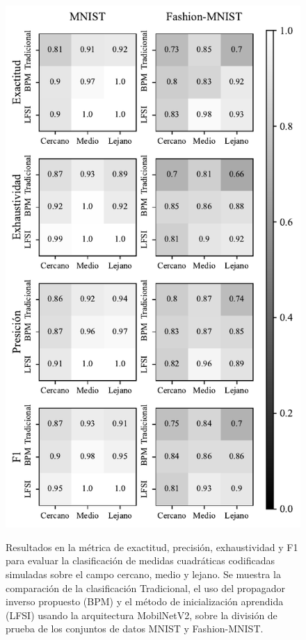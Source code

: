 \begin{figure}[!h]
    \centering
    \caption{Resultados en la métrica de exactitud, precisión, exhaustividad y F1 para evaluar la clasificación de medidas cuadráticas codificadas simuladas sobre el campo cercano, medio y lejano. Se muestra la comparación de la clasificación Tradicional, el uso del propagador inverso propuesto (BPM) y el método de inicialización aprendida (LFSI) usando la arquitectura MobilNetV2, sobre la división de prueba de los conjuntos de datos MNIST y Fashion-MNIST.}
    \includegraphics[height=0.8\textheight]{images/resultados/test_result_mobilnet.pdf}
    \label{fig:results_mob}
\end{figure}


